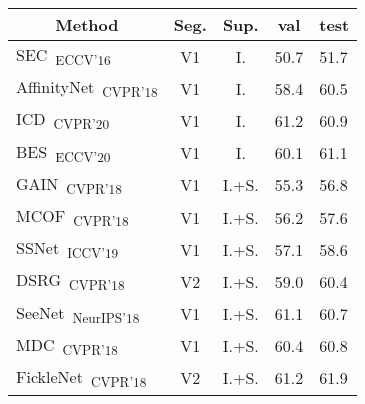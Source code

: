 \begin{table}[]
\normalsize
\centering
{\small
\begin{tabular}{@{}lccll@{}}
\toprule
\multicolumn{1}{c}{Method}                                                              & Seg.      & Sup.  & \multicolumn{1}{c}{val} & \multicolumn{1}{c}{test} \\ \midrule
\multicolumn{1}{l}{SEC~\cite{kolesnikov2016seed}\textsubscript{ECCV'16}}                & V1        & I.    & 50.7                    & 51.7                     \\
\multicolumn{1}{l}{AffinityNet~\cite{ahn2018learning}\textsubscript{CVPR'18}}           & V1        & I.    & 58.4                    & 60.5                     \\
\multicolumn{1}{l}{ICD~\cite{fan2020learning}\textsubscript{CVPR'20}}                   & V1        & I.    & 61.2                    & 60.9                     \\
\multicolumn{1}{l}{BES~\cite{chen2020boundary}\textsubscript{ECCV'20}}                  & V1        & I.    & 60.1                    & 61.1                     \\
\multicolumn{1}{l}{GAIN~\cite{li2018tell}\textsubscript{CVPR'18}}                       & V1        & I.+S. & 55.3                    & 56.8                     \\
\multicolumn{1}{l}{MCOF~\cite{wang2018weakly}\textsubscript{CVPR'18}}                   & V1        & I.+S. & 56.2                    & 57.6                     \\
\multicolumn{1}{l}{SSNet~\cite{zeng2019joint}\textsubscript{ICCV'19}}                   & V1        & I.+S. & 57.1                    & 58.6                     \\
\multicolumn{1}{l}{DSRG~\cite{huang2018weakly}\textsubscript{CVPR'18}}                  & V2        & I.+S. & 59.0                    & 60.4                     \\
\multicolumn{1}{l}{SeeNet~\cite{hou2018self}\textsubscript{NeurIPS'18}}                 & V1        & I.+S. & 61.1                    & 60.7                     \\
\multicolumn{1}{l}{MDC~\cite{wei2018revisiting}\textsubscript{CVPR'18}}                 & V1        & I.+S. & 60.4                    & 60.8                     \\
\multicolumn{1}{l}{FickleNet~\cite{lee2019ficklenet}\textsubscript{CVPR'18}}            & V2        & I.+S. & 61.2                    & 61.9                     \\

\end{tabular}}
\end{table}
